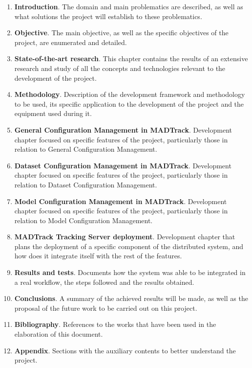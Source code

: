 \begin{enumerate}

\item \textbf{Introduction}. The domain and main problematics are described, as well as what solutions the project will establish to these problematics.

\item \textbf{Objective}. The main objective, as well as the specific objectives of the project, are enumerated and detailed.

\item \textbf{State-of-the-art research}. This chapter contains the results of an extensive research and study of all the concepts and technologies relevant to the development of the project.

\item \textbf{Methodology}. Description of the development framework and methodology to be used, its specific application to the development of the project and the equipment used during it.

\item \textbf{General Configuration Management in MADTrack}. Development chapter focused on specific features of the project, particularly those in relation to General Configuration Management.
\item \textbf{Dataset Configuration Management in MADTrack}. Development chapter focused on specific features of the project, particularly those in relation to Dataset Configuration Management.
\item \textbf{Model Configuration Management in MADTrack}. Development chapter focused on specific features of the project, particularly those in relation to Model Configuration Management.
\item \textbf{MADTrack Tracking Server deployment}. Development chapter that plans the deployment of a specific component of the distributed system, and how does it integrate itself with the rest of the features.

\item \textbf{Results and tests}. Documents how the system was able to be integrated in a real workflow, the steps followed and the results obtained.

\item \textbf{Conclusions}. A summary of the achieved results will be made, as well as the proposal of the future work to be carried out on this project.

\item \textbf{Bibliography}. References to the works that have been used in the elaboration of this document.

\item \textbf{Appendix}. Sections with the auxiliary contents to better understand the project.
\end{enumerate}









